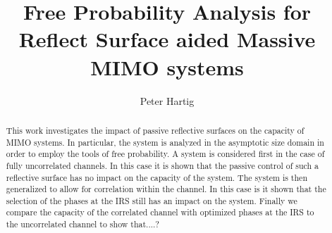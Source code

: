\documentclass[12pt,a4paper]{report}
\title{Free Probability Analysis for Reflect Surface aided Massive MIMO systems}
\author{Peter Hartig}
\begin{document}
\maketitle
\begin{abstract}
This work investigates the impact of passive reflective surfaces on the capacity of MIMO systems. In particular, the system is analyzed in the asymptotic size domain in order to employ the tools of free probability. A system is considered first in the case of fully uncorrelated channels. In this case it is shown that the passive control of such a reflective surface has no impact on the capacity of the system. The system is then generalized to allow for correlation within the channel. In this case is it shown that the selection of the phases at the IRS still has an impact on the system. Finally we compare the capacity of the correlated channel with optimized phases at the IRS to the uncorrelated channel to show that....?
\end{abstract}
%
\tableofcontents
\end{document}
